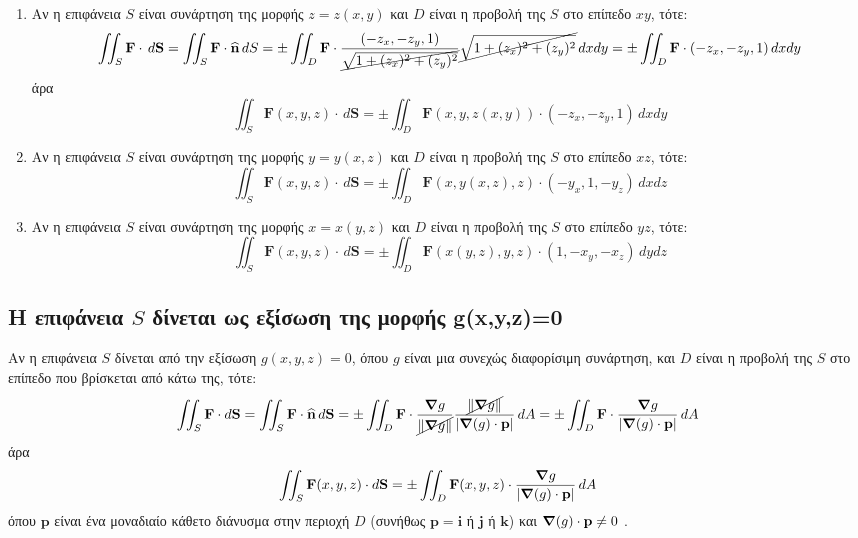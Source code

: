 \begin{enumerate}
  \item Αν η επιφάνεια $S$ είναι συνάρτηση της μορφής $ z=z(x,y) $ και $D$ είναι η 
    προβολή της $S$ στο επίπεδο $ xy $, τότε: 
    \[
      \iint_{S} \mathbf{F} \cdot \,{d\mathbf{S}} = \iint_{S} \mathbf{F} \cdot
      \mathbf{\widehat{n}} \,{dS} = 
      \pm\iint_{D} 
      \mathbf{F} \cdot \frac{(-z_{x},-z_{y},1)}{\cancel{\sqrt{1+(z_{x})^{2}+
      (z_{y})^{2}}}} \cancel{\sqrt{1+(z_{x})^{2}+(z_{y})^{2}}} \,{dx}{dy} = 
      \pm\iint_{D} \mathbf{F} \cdot (-z_{x},-z_{y},1) \,{dx}{dy}
    \]
    άρα
    \[
      \iint_{S} \mathbf{F}(x,y,z) \cdot \,{d\mathbf{S}} = \pm\iint_{D} 
      \mathbf{F}(x,y,z(x,y)) \cdot (-z_{x},-z_{y},1) \,{dx}{dy} 
    \] 

  \item Αν η επιφάνεια $S$ είναι συνάρτηση της μορφής $ y=y(x,z) $ και $D$ είναι η 
    προβολή της $S$ στο επίπεδο $ xz $, τότε: 
    \[
      \iint_{S} \mathbf{F}(x,y,z) \cdot \,{d\mathbf{S}} = \pm\iint_{D} 
      \mathbf{F}(x,y(x,z),z) \cdot (-y_{x},1,-y_{z}) \,{dx}{dz} 
    \]

  \item Αν η επιφάνεια $S$ είναι συνάρτηση της μορφής $ x=x(y,z) $ και $D$ είναι η 
    προβολή της $S$ στο επίπεδο $ yz $, τότε: 
    \[
      \iint_{S} \mathbf{F}(x,y,z) \cdot \,{d\mathbf{S}} = \pm\iint_{D} 
      \mathbf{F}(x(y,z),y,z) \cdot (1,-x_{y},-x_{z}) \,{dy}{dz} 
    \]

\end{enumerate}

\subsection*{Η επιφάνεια $S$ δίνεται ως εξίσωση της μορφής g(x,y,z)=0}
Αν η επιφάνεια $S$ δίνεται από την εξίσωση $ g(x,y,z) = 0 $, όπου $ g $ είναι μια 
συνεχώς διαφορίσιμη συνάρτηση, και $D$ είναι η προβολή της $S$ στο επίπεδο που βρίσκεται 
από κάτω της, τότε:
\begin{equation*}
  \iint_{S} \mathbf{F}\cdot {d\mathbf{S}} = \iint_{S} \mathbf{F} \cdot \mathbf{\widehat{n}} \,{d\mathbf{S}} = 
  \pm\iint_{D} \mathbf{F} \cdot \frac{\grad{g}}{\cancel{\norm{\grad
  g}}}\frac{\cancel{\norm{\grad g}}}{\abs{\grad(g) \cdot \mathbf{p}}} \,{dA} =
  \pm\iint_{D} \mathbf{F} \cdot 
  \frac{\grad{g}}{\abs{\grad(g) \cdot \mathbf{p}}} \,{dA} 
\end{equation*}
άρα
\begin{equation}\label{eq:surface_int3}
  \iint_{S} \mathbf{F}(x,y,z) \cdot {d\mathbf{S}} = 
  \pm\iint_{D} \mathbf{F}(x,y,z) \cdot 
  \frac{\grad{g}}{\abs{\grad(g) \cdot \mathbf{p}}} \,{dA} 
\end{equation}
όπου $ \mathbf{p} $ είναι ένα μοναδιαίο κάθετο διάνυσμα στην περιοχή $D$ (συνήθως 
$ \mathbf{p} = \mathbf{i} $ ή $ \mathbf{j} $ ή $ \mathbf{k} $) και 
$ \grad(g)\cdot \mathbf{p} \neq 0 $ .  

